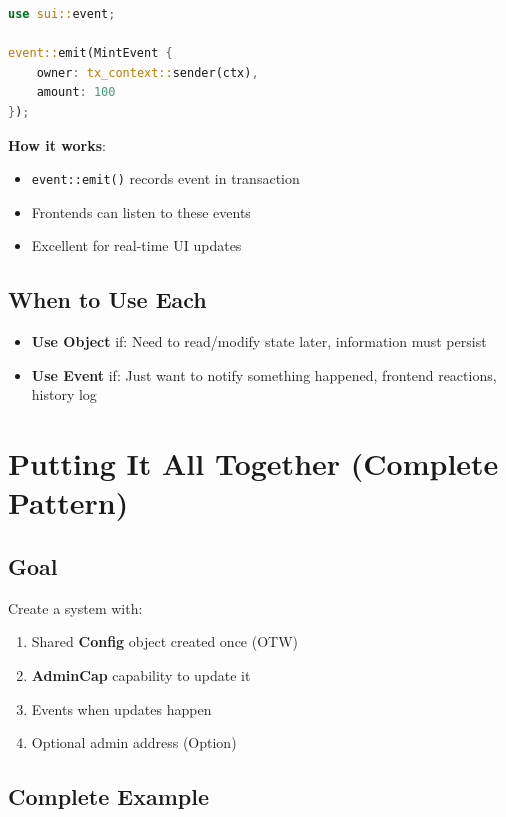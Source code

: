\documentclass[11pt]{article}
\begin{document}
\begin{lstlisting}[language=Rust]
use sui::event;

event::emit(MintEvent {
    owner: tx_context::sender(ctx),
    amount: 100
});
\end{lstlisting}

\begin{noteBox}
\textbf{How it works}:
\begin{itemize}
  \item \texttt{event::emit()} records event in transaction
  \item Frontends can listen to these events
  \item Excellent for real-time UI updates
\end{itemize}
\end{noteBox}

\subsection{When to Use Each}

\begin{itemize}
  \item \textbf{Use Object} if: Need to read/modify state later, information must persist
  \item \textbf{Use Event} if: Just want to notify something happened, frontend reactions, history log
\end{itemize}

\section{Putting It All Together (Complete Pattern)}

\subsection{Goal}

Create a system with:
\begin{enumerate}
  \item Shared \textbf{Config} object created once (OTW)
  \item \textbf{AdminCap} capability to update it
  \item Events when updates happen
  \item Optional admin address (Option)
\end{enumerate}

\subsection{Complete Example}
\end{document}
